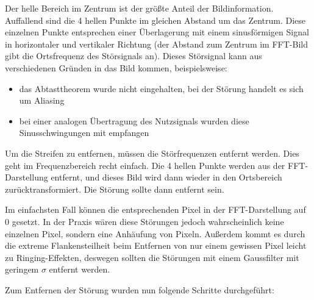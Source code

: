 Der helle Bereich im Zentrum ist der größte Anteil der Bildinformation. Auffallend sind die 4 hellen Punkte im gleichen Abstand um das Zentrum. Diese einzelnen Punkte entsprechen einer Überlagerung mit einem sinusförmigen Signal in horizontaler und vertikaler Richtung (der Abstand zum Zentrum im FFT-Bild gibt die Ortsfrequenz des Störsignals an). Dieses Störsignal kann aus verschiedenen Gründen in das Bild kommen, beispielsweise:

\begin{itemize}
 \item das Abtasttheorem wurde nicht eingehalten, bei der Störung handelt es sich um Aliasing
 \item bei einer analogen Übertragung des Nutzsignals wurden diese Sinusschwingungen mit empfangen
\end{itemize}

Um die Streifen zu entfernen, müssen die Störfrequenzen entfernt werden. Dies geht im Frequenzbereich recht einfach. Die 4 hellen Punkte werden aus der FFT-Darstellung entfernt, und dieses Bild wird dann wieder in den Ortsbereich zurücktransformiert. Die Störung sollte dann entfernt sein.

Im einfachsten Fall können die entsprechenden Pixel in der FFT-Darstellung auf 0 gesetzt. In der Praxis wären diese Störungen jedoch wahrscheinlich keine einzelnen Pixel, sondern eine Anhäufung von Pixeln. Außerdem kommt es durch die extreme Flankensteilheit beim Entfernen von nur einem gewissen Pixel leicht zu Ringing-Effekten, deswegen sollten die Störungen mit einem Gaussfilter mit geringem $\sigma$ entfernt werden.

Zum Entfernen der Störung wurden nun folgende Schritte durchgeführt:

